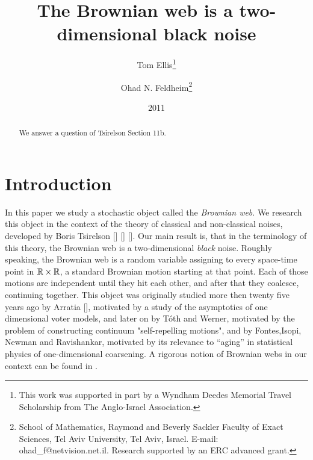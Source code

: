 {
\title{The Brownian web is a two-dimensional black noise}

\newcommand{\tomthanks}{This work was supported in part by
a Wyndham Deedes Memorial Travel Scholarship from The Anglo-Israel
Association.}

\newcommand{\ohadthanks}{School of Mathematics, Raymond and Beverly Sackler Faculty of Exact
Sciences, Tel Aviv University, Tel Aviv, Israel. E-mail:
ohad\_f@netvision.net.il. Research supported by an ERC advanced grant.}

\author{Tom Ellis\thanks{\tomthanks}\\%
\and Ohad N. Feldheim\thanks{\ohadthanks}}

\date{2011}

\maketitle

\begin{abstract}
We answer a question of
Tsirelson \cite{tsirelson-nonclassical-stochastic-flows} Section 11b.

\end{abstract}

\section{Introduction}
In this paper we study a stochastic object called the \emph{Brownian web}. We
research this object in the context of the theory of classical and
non-classical noises, developed by Boris Tsirelson [] [] []. Our main result
is, that in the terminology of this theory, the Brownian web is a
two-dimensional \emph{black} noise.
 Roughly speaking, the Brownian web is a random variable assigning to
every space-time point in $\mathbb{R}\times\mathbb{R}$, a standard Brownian motion starting
at that point. Each of those motions are independent until they hit each
other, and after that they coalesce, continuing together. This object was
originally studied more then twenty five years ago by Arratia [], motivated
by a study of the asymptotics of one dimensional voter models, and later on
by T\'{o}th and Werner, motivated by the problem of constructing continuum
"self-repelling motions", and by Fontes,Isopi, Newman and Ravishankar,
motivated by its relevance to ``aging'' in statistical physics of
one-dimensional coarsening. A rigorous notion of Brownian webs in our context
can be found in .

}
